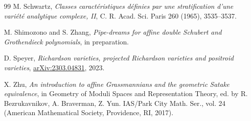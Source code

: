 \documentclass[12pt]{amsart}
\begin{document}
\begin{thebibliography}{99}
M. Schwartz, {\em Classes caract\'eristiques d\'efinies par une stratification
d'une vari\'et\'e analytique complexe, II}, C. R. Acad. Sci. Paris  260 (1965), 3535--3537.

M. Shimozono and S. Zhang, {\em
Pipe-dreams for affine double Schubert and Grothendieck polynomials}, in preparation.

D. Speyer, {\em Richardson varieties, projected Richardson varieties and positroid varieties}, \href{https://arxiv.org/abs/2303.04831}{arXiv:2303.04831}, 2023.




X. Zhu, {\em An introduction to affine Grassmannians and the geometric Satake equivalence},
in Geometry of Moduli Spaces and Representation Theory, ed. by R. Bezrukavnikov,
A. Braverman, Z. Yun. IAS/Park City Math. Ser., vol. 24 (American Mathematical
Society, Providence, RI, 2017).

\end{thebibliography}
\end{document}
